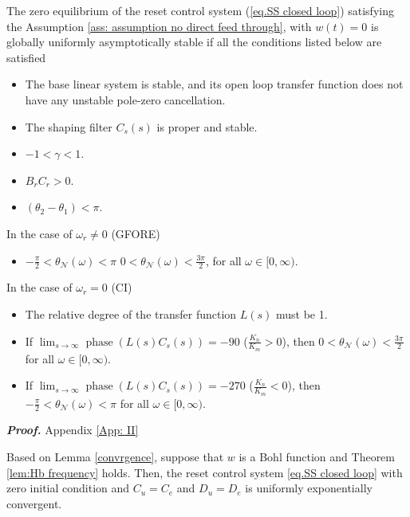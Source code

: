 \begin{theorem}
\label{lem:Hb frequency}
   The zero equilibrium of the reset control system (\ref{eq.SS closed loop}) satisfying the Assumption \ref{ass: assumption no direct feed through}, with $w(t) = 0$ is globally uniformly asymptotically stable if all the conditions listed below are satisfied
   \begin{itemize}
    \item The base linear system is stable, and its open loop transfer function does not have any unstable pole-zero cancellation.
    \item The shaping filter $C_s(s)$ is proper and stable.
    \item $-1<\gamma<1$.
    \item $B_r C_r >0$.
    \item $(\theta_2-\theta_1)<\pi$.
     \end{itemize}
     In the case of $\omega_r \neq 0$ (GFORE)
    \begin{itemize}
        \item $-\frac{\pi}{2}<\theta_{\mathcal{N}} (\omega)<\pi$  $0<\theta_{\mathcal{N}} (\omega)<\frac{3\pi}{2}$, \quad for all $\omega \in [0,\infty)$.
    \end{itemize}
    In the case of $\omega_r=0$ (CI)
    \begin{itemize}
        \item The relative degree of the transfer function $L(s)$ must be 1.
         \item If $\lim_{s \to \infty} \operatorname{phase}\left(L(s) C_s(s)\right) = -90$ ($\frac{K_{n}}{K_{m}} > 0$), then $0 < \theta_{\mathcal{N}}(\omega) < \frac{3\pi}{2}$ for all $\omega \in [0,\infty)$.
    \item If $\lim_{s \to \infty} \operatorname{phase}\left(L(s) C_s(s)\right) = -270$ ($\frac{K_{n}}{K_{m}} < 0$), then $-\frac{\pi}{2} < \theta_{\mathcal{N}}(\omega) < \pi$ for all $\omega \in [0,\infty)$.
   \end{itemize}
   \textit{\textbf{Proof.}} Appendix \ref{App: II}\\
\end{theorem}

\begin{corollary}
\label{col: new convergence}
Based on Lemma \ref{convrgence}, suppose that $w$ is a Bohl function and Theorem \ref{lem:Hb frequency} holds. Then, the reset control system \eqref{eq.SS closed loop} with zero initial condition and $C_u=C_e$ and $D_u=D_e$ is uniformly exponentially convergent.\\
\end{corollary}

